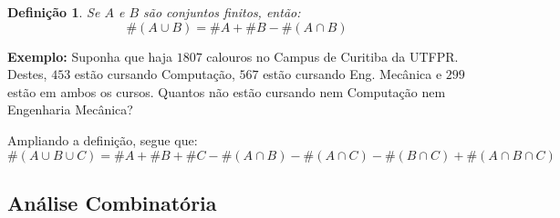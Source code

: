 \documentclass[oneside,a4paper,12pt]{article}
\newtheorem{definition}{Definição}[section]
\begin{document}
\begin{definition}
		Se $A$ e $B$ são conjuntos finitos, então:
		$$\#(A \cup B) = \#A + \#B - \#(A \cap B)$$
\end{definition}

{\bf Exemplo: } Suponha que haja $1807$ calouros no Campus de Curitiba da UTFPR. Destes, $453$ estão cursando Computação, $567$ estão cursando Eng. Mecânica e $299$ estão em ambos os cursos. Quantos não estão cursando nem Computação nem Engenharia Mecânica?

\vspace{200pt}

Ampliando a definição, segue que:
$$\#(A \cup B \cup C) = \#A + \#B + \#C - \#(A \cap B) - \#(A \cap C) - \#(B \cap C) + \#(A \cap B \cap C)$$


\subsection{Análise Combinatória}


	
\end{document}

